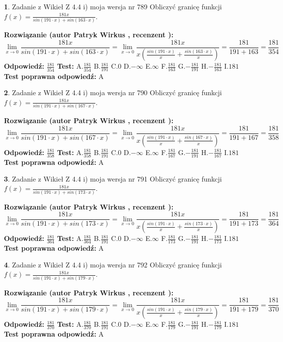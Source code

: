 \documentclass[12pt, a4paper]{article}
\theoremstyle{definition} %
\newtheorem{zad}{}
\newcommand{\zadStart}[1]{\begin{zad}#1\newline}
\newcommand{\zadStop}{\end{zad}}
\newcommand{\rozwStart}[2]{\noindent \textbf{Rozwiązanie (autor #1 , recenzent #2): }\newline}
\newcommand{\rozwStop}{\newline}
\newcommand{\odpStart}{\noindent \textbf{Odpowiedź:}\newline}
\newcommand{\odpStop}{\newline}
\newcommand{\testStart}{\noindent \textbf{Test:}\newline}
\newcommand{\testStop}{\newline}
\newcommand{\kluczStart}{\noindent \textbf{Test poprawna odpowiedź:}\newline}
\newcommand{\kluczStop}{\newline}
\begin{document}
\zadStart{Zadanie z Wikieł Z 4.4 i) moja wersja nr 789}
Obliczyć granicę funkcji $f(x)=\frac{181x}{sin(191\cdot x) +sin(163\cdot x)}$.
\zadStop
\rozwStart{Patryk Wirkus}{}
$$\lim\limits_{x\to 0}\frac{181x}{sin(191\cdot x) +sin(163\cdot x)}=\lim\limits_{x\to 0}\frac{181x}{x(\frac{sin(191\cdot x)}{x}+\frac{sin(163\cdot x)}{x})}=\frac{181}{191+163} = \frac{181}{354}$$
\rozwStop
\odpStart
$\frac{181}{354}$
\odpStop
\testStart
A.$\frac{181}{354}$
B.$\frac{181}{191}$
C.$0$
D.$-\infty$
E.$\infty$
F.$\frac{181}{163}$
G.$-\frac{181}{191}$
H.$-\frac{181}{163}$
I.$181$
\testStop
\kluczStart
A
\kluczStop



\zadStart{Zadanie z Wikieł Z 4.4 i) moja wersja nr 790}
Obliczyć granicę funkcji $f(x)=\frac{181x}{sin(191\cdot x) +sin(167\cdot x)}$.
\zadStop
\rozwStart{Patryk Wirkus}{}
$$\lim\limits_{x\to 0}\frac{181x}{sin(191\cdot x) +sin(167\cdot x)}=\lim\limits_{x\to 0}\frac{181x}{x(\frac{sin(191\cdot x)}{x}+\frac{sin(167\cdot x)}{x})}=\frac{181}{191+167} = \frac{181}{358}$$
\rozwStop
\odpStart
$\frac{181}{358}$
\odpStop
\testStart
A.$\frac{181}{358}$
B.$\frac{181}{191}$
C.$0$
D.$-\infty$
E.$\infty$
F.$\frac{181}{167}$
G.$-\frac{181}{191}$
H.$-\frac{181}{167}$
I.$181$
\testStop
\kluczStart
A
\kluczStop



\zadStart{Zadanie z Wikieł Z 4.4 i) moja wersja nr 791}
Obliczyć granicę funkcji $f(x)=\frac{181x}{sin(191\cdot x) +sin(173\cdot x)}$.
\zadStop
\rozwStart{Patryk Wirkus}{}
$$\lim\limits_{x\to 0}\frac{181x}{sin(191\cdot x) +sin(173\cdot x)}=\lim\limits_{x\to 0}\frac{181x}{x(\frac{sin(191\cdot x)}{x}+\frac{sin(173\cdot x)}{x})}=\frac{181}{191+173} = \frac{181}{364}$$
\rozwStop
\odpStart
$\frac{181}{364}$
\odpStop
\testStart
A.$\frac{181}{364}$
B.$\frac{181}{191}$
C.$0$
D.$-\infty$
E.$\infty$
F.$\frac{181}{173}$
G.$-\frac{181}{191}$
H.$-\frac{181}{173}$
I.$181$
\testStop
\kluczStart
A
\kluczStop



\zadStart{Zadanie z Wikieł Z 4.4 i) moja wersja nr 792}
Obliczyć granicę funkcji $f(x)=\frac{181x}{sin(191\cdot x) +sin(179\cdot x)}$.
\zadStop
\rozwStart{Patryk Wirkus}{}
$$\lim\limits_{x\to 0}\frac{181x}{sin(191\cdot x) +sin(179\cdot x)}=\lim\limits_{x\to 0}\frac{181x}{x(\frac{sin(191\cdot x)}{x}+\frac{sin(179\cdot x)}{x})}=\frac{181}{191+179} = \frac{181}{370}$$
\rozwStop
\odpStart
$\frac{181}{370}$
\odpStop
\testStart
A.$\frac{181}{370}$
B.$\frac{181}{191}$
C.$0$
D.$-\infty$
E.$\infty$
F.$\frac{181}{179}$
G.$-\frac{181}{191}$
H.$-\frac{181}{179}$
I.$181$
\testStop
\kluczStart
A
\kluczStop
\end{document}
